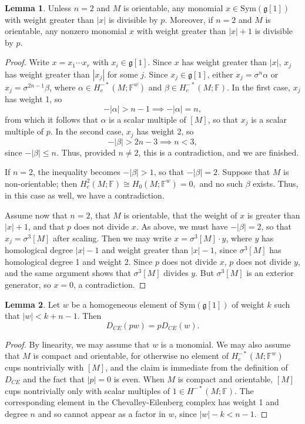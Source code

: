 \documentclass{compositio}
\theoremstyle{definition}\newtheorem{definition}{Definition}[section]
\theoremstyle{theorem}\newtheorem{lemma}[definition]{Lemma}
\theoremstyle{remark}\newtheorem*{conventions}{Conventions}
\theoremstyle{remark}\newtheorem*{acknowledgments}{Acknowledgments}
\theoremstyle{remark}\newtheorem*{outline}{Outline}
\theoremstyle{remark}\newtheorem*{questions}{Questions}
\theoremstyle{remark}\newtheorem{example}[definition]{Example}
\theoremstyle{definition}\newtheorem{construction}[definition]{Construction}
\theoremstyle{definition}\newtheorem*{convention}{Convention}
\theoremstyle{definition}\newtheorem*{conjecture}{Conjecture}
\theoremstyle{theorem}\newtheorem{theorem}[definition]{Theorem}
\theoremstyle{theorem}\newtheorem{paradigm}[definition]{Paradigm}
\theoremstyle{remark}\newtheorem{remark}[definition]{Remark}
\theoremstyle{corollary}\newtheorem{corollary}[definition]{Corollary}
\theoremstyle{theorem}\newtheorem{proposition}[definition]{Proposition}
\theoremstyle{definition}\newtheorem{question}[definition]{Question}
\begin{document}
\begin{lemma}\label{divisibility}
Unless $n=2$ and $M$ is orientable, any monomial $x\in{\mathrm{Sym}}(\mathfrak{g}[1])$ with weight greater than $|x|$ is divisible by $p$. Moreover, if $n=2$ and $M$ is orientable, any nonzero monomial $x$ with weight greater than $|x|+1$ is divisible by $p$.
\end{lemma}
\begin{proof}
Write $x=x_1\cdots x_r$ with $x_i\in \mathfrak{g}[1]$. Since $x$ has weight greater than $|x|$, $x_j$ has weight greater than $|x_j|$ for some $j$. Since $x_j\in \mathfrak{g}[1]$, either $x_j=\sigma^n\alpha$ or $x_j=\sigma^{2n-1}\beta$, where $\alpha\in H_c^{-*}(M;\mathbb{F}^w)$ and $\beta\in H^{-*}_c(M;\mathbb{F})$. In the first case, $x_j$ has weight 1, so $$-|\alpha|>n-1\implies -|\alpha|=n,$$ from which it follows that $\alpha$ is a scalar multiple of $[M]$, so that $x_j$ is a scalar multiple of $p$. In the second case, $x_j$ has weight 2, so $$-|\beta|>2n-3\implies n<3,$$ since $-|\beta|\leq n$. Thus, provided $n\neq 2$, this is a contradiction, and we are finished. 

If $n=2$, the inequality becomes $-|\beta|>1$, so that $-|\beta|=2$. Suppose that $M$ is non-orientable; then $H_c^{2}(M;\mathbb{F})\cong H_0(M;\mathbb{F}^w)=0,$ and no such $\beta$ exists. Thus, in this case as well, we have a contradiction.

Assume now that $n=2$, that $M$ is orientable, that the weight of $x$ is greater than $|x|+1$, and that $p$ does not divide $x$. As above, we must have $-|\beta|=2$, so that $x_j=\sigma^{3}[M]$ after scaling. Then we may write $x=\sigma^3[M]\cdot y$, where $y$ has homological degree $|x|-1$ and weight greater than $|x|-1$, since $\sigma^3[M]$ has homological degree 1 and weight 2. Since $p$ does not divide $x$, $p$ does not divide $y$, and the same argument shows that $\sigma^{3}[M]$ divides $y$. But $\sigma^{3}[M]$ is an exterior generator, so $x=0$, a contradiction.
\end{proof}

\begin{lemma}\label{differential}
Let $w$ be a homogeneous element of ${\mathrm{Sym}}(\mathfrak{g}[1])$ of weight $k$ such that $|w|< k+n-1$. Then $$D_{CE}(pw)=pD_{CE}(w).$$
\end{lemma}
\begin{proof}
By linearity, we may assume that $w$ is a monomial. We may also assume that $M$ is compact and orientable, for otherwise no element of $H_c^{-*}(M;\mathbb{F}^w)$ cups nontrivially with $[M]$, and the claim is immediate from the definition of $D_{CE}$ and the fact that $|p|=0$ is even. When $M$ is compact and orientable, $[M]$ cups nontrivially only with scalar multiples of $1\in H^{-*}(M;\mathbb{F})$. The corresponding element in the Chevalley-Eilenberg complex has weight 1 and degree $n$ and so cannot appear as a factor in $w$, since $|w|-k<n-1$.
\end{proof}
\end{document}
